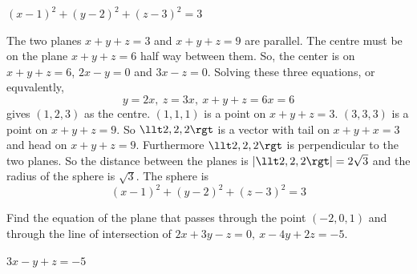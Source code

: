 
\begin{answer}
$(x-1)^2+(y-2)^2+(z-3)^2=3$
\end{answer}

\begin{solution}
The two planes $x+y+z=3$ and $x+y+z=9$ are parallel.
The centre must be on the plane $x+y+z=6$ half way between them.
So, the center is on $x+y+z=6$, $2x-y=0$ and $3x-z=0$. Solving these
three equations, or equvalently,
\begin{equation*}
y=2x,\ z=3x,\ x+y+z=6x=6
\end{equation*}
gives $(1,2,3)$ as the centre. $(1,1,1)$ is a point on
$x+y+z=3$. $(3,3,3)$ is a point on $x+y+z=9$. So $\llt 2,2,2\rgt$ is a vector
with tail on $x+y+x=3$ and head on $x+y+z=9$. Furthermore $\llt 2,2,2\rgt$
is perpendicular to the two planes. So the distance between the planes
is $|\llt 2,2,2\rgt|=2\sqrt{3}$ and the radius of the sphere is $\sqrt{3}$. 
The sphere is
\begin{equation*}
(x-1)^2+(y-2)^2+(z-3)^2=3
\end{equation*}
\end{solution}


\begin{question}
Find the equation of the plane that passes through the point
$(-2,0,1)$ and through the line of intersection of $2x+3y-z=0,\ x-4y+2z=-5$.
\end{question}


\begin{answer}
$3x-y+z=-5$
\end{answer}

